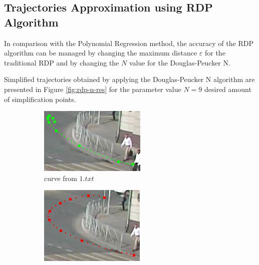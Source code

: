\subsection{Trajectories Approximation using RDP Algorithm}

In comparison with the Polynomial Regression method, the accuracy of the RDP algorithm can be managed by changing the maximum distance $\varepsilon$ for the traditional RDP and by changing the $N$ value for the Douglas-Peucker N. 

Simplified trajectories obtained by applying the Douglas-Peucker N algorithm are presented in Figure \ref{fig:rdp-n-res} for the parameter value $N = 9$ desired amount of simplification points.

\begin{figure}[!htb]
	\begin{subfigure}[!htb]{0.32\textwidth}
		\centering{}
		\includegraphics[width=\textwidth]{images/rdp-n-curve-1.png}
		\caption{curve from $1.txt$}
	\end{subfigure}
	\hfill
	\begin{subfigure}[!htb]{0.32\textwidth}
		\centering{}
		\includegraphics[width=\textwidth]{images/rdp-n-turn.png}

\end{subfigure}
\end{figure}
